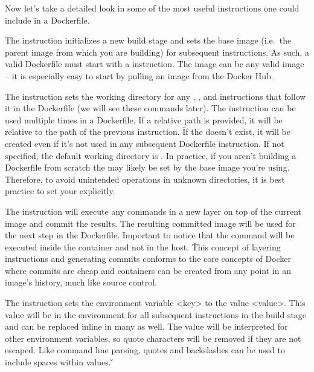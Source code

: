 Now let's take a detailed look in some of the most useful instructions one could include in a Dockerfile.
\bit
\item The  instruction initializes a new build stage and sets the base image (i.e.\ the parent image from
which you are building) for subsequent instructions. As such, a valid Dockerfile must start with a 
instruction. The image can be any valid image – it is especially easy to start by pulling an image from the Docker Hub.
\item The  instruction sets the working directory for any , , and 
instructions that follow it in the Dockerfile (we will see these commands later). The  instruction can
be used multiple times in a Dockerfile. If a relative path is provided, it will be relative to the path of the
previous  instruction. \v

If the  doesn't exist, it will be created even if it's not used in any subsequent Dockerfile
instruction. If not specified, the default working directory is \code{/}. In practice, if you aren't building a
Dockerfile from scratch the  may likely be set by the base image you're using. Therefore, to avoid
unintended operations in unknown directories, it is best practice to set your  explicitly.
\item The  instruction will execute any commands in a new layer on top of the current image and commit the
results. The resulting committed image will be used for the next step in the Dockerfile. Important to notice that the
command will be executed inside the container and not in the host. \v

This concept of layering  instructions and generating commits conforms to the core concepts of Docker where
commits are cheap and containers can be created from any point in an image's history, much like source control.
\item The  instruction sets the environment variable <key> to the value <value>. This value will be in the
environment for all subsequent instructions in the build stage and can be replaced inline in many as well. The value
will be interpreted for other environment variables, so quote characters will be removed if they are not escaped.
Like command line parsing, quotes and backslashes can be used to include spaces within values. \v

